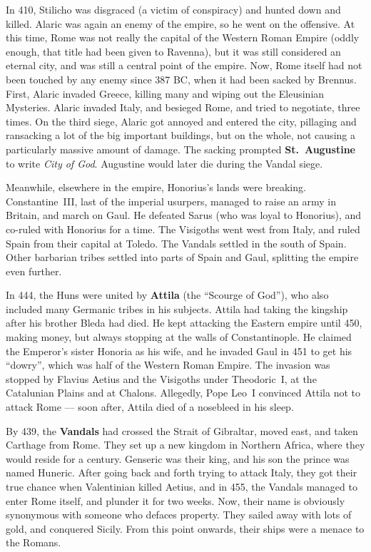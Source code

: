 In 410, Stilicho was disgraced (a victim of conspiracy) and hunted down and killed.
Alaric was again an enemy of the empire, so he went on the offensive.
At this time, Rome was not really the capital of the Western Roman Empire
(oddly enough, that title had been given to Ravenna),
but it was still considered an eternal city, and was still a central point of the empire.
Now, Rome itself had not been touched by any enemy since 387 BC, when it had been sacked by Brennus.
First, Alaric invaded Greece, killing many and wiping out the Eleusinian Mysteries.
Alaric invaded Italy, and besieged Rome, and tried to negotiate, three times.
On the third siege, Alaric got annoyed and entered the city,
pillaging and ransacking a lot of the big important buildings,
but on the whole, not causing a particularly massive amount of damage.
The sacking prompted \textbf{St.\ Augustine} to write \textit{City of God}.
Augustine would later die during the Vandal siege.

Meanwhile, elsewhere in the empire, Honorius's lands were breaking.
Constantine~III, last of the imperial usurpers, managed to raise an army in Britain, and march on Gaul.
He defeated Sarus (who was loyal to Honorius), and co-ruled with Honorius for a time.
The Visigoths went west from Italy, and ruled Spain from their capital at Toledo.
The Vandals settled in the south of Spain.
Other barbarian tribes settled into parts of Spain and Gaul, splitting the empire even further.

In 444, the Huns were united by \textbf{Attila} (the ``Scourge of God''),
who also included many Germanic tribes in his subjects.
Attila had taking the kingship after his brother Bleda had died.
He kept attacking the Eastern empire until 450, making money,
but always stopping at the walls of Constantinople.
He claimed the Emperor's sister Honoria as his wife,
and he invaded Gaul in 451 to get his ``dowry'', which was half of the Western Roman Empire.
The invasion was stopped by Flavius Aetius and the Visigoths under Theodoric~I,
at the Catalunian Plains and at Chalons.
Allegedly, Pope Leo~I convinced Attila not to attack Rome ---
soon after, Attila died of a nosebleed in his sleep.

By 439, the \textbf{Vandals} had crossed the Strait of Gibraltar, moved east, and taken Carthage from Rome.
They set up a new kingdom in Northern Africa, where they would reside for a century.
Genseric was their king, and his son the prince was named Huneric.
After going back and forth trying to attack Italy, they got their true chance when Valentinian killed Aetius,
and in 455, the Vandals managed to enter Rome itself, and plunder it for two weeks.
Now, their name is obviously synonymous with someone who defaces property.
They sailed away with lots of gold, and conquered Sicily.
From this point onwards, their ships were a menace to the Romans.

